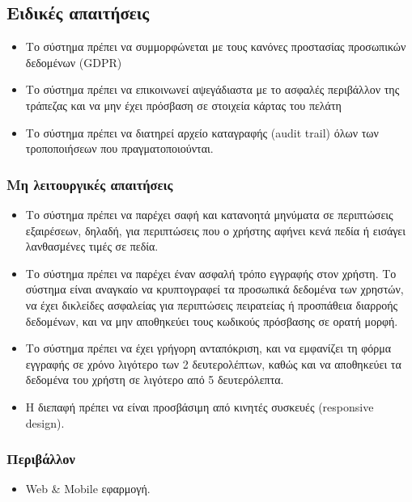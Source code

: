 \documentclass[12pt,a4paper,twoside]{book}
\begin{document}
\subsection{Ειδικές απαιτήσεις} %
\begin{itemize}
  \item Το σύστημα πρέπει να συμμορφώνεται με τους κανόνες προστασίας προσωπικών δεδομένων (GDPR)  %
  \item Το σύστημα πρέπει να επικοινωνεί αψεγάδιαστα με το ασφαλές περιβάλλον της τράπεζας και να μην έχει πρόσβαση σε στοιχεία κάρτας του πελάτη   %
  \item Το σύστημα πρέπει να διατηρεί αρχείο καταγραφής (audit trail) όλων των τροποποιήσεων που πραγματοποιούνται. %
\end{itemize}

\subsubsection{Μη λειτουργικές απαιτήσεις}
\begin{itemize}
  \item Το σύστημα πρέπει να παρέχει σαφή και κατανοητά μηνύματα σε περιπτώσεις εξαιρέσεων, δηλαδή, για περιπτώσεις που ο χρήστης αφήνει κενά πεδία ή εισάγει λανθασμένες τιμές σε πεδία.%
  \item Το σύστημα πρέπει να παρέχει έναν ασφαλή τρόπο εγγραφής στον χρήστη. Το σύστημα είναι αναγκαίο να κρυπτογραφεί τα προσωπικά δεδομένα των χρηστών, να έχει δικλείδες ασφαλείας για περιπτώσεις πειρατείας ή προσπάθεια διαρροής δεδομένων, και να μην αποθηκεύει τους κωδικούς πρόσβασης σε ορατή μορφή. %
  \item Το σύστημα πρέπει να έχει γρήγορη ανταπόκριση, και να εμφανίζει τη φόρμα εγγραφής σε χρόνο λιγότερο των 2 δευτερολέπτων, καθώς και να αποθηκεύει τα δεδομένα του χρήστη σε λιγότερο από 5 δευτερόλεπτα. %
  \item Η διεπαφή πρέπει να είναι προσβάσιμη από κινητές συσκευές (responsive design). %
\end{itemize}

\subsubsection{Περιβάλλον}
\begin{itemize}
  \item Web \& Mobile εφαρμογή.
\end{itemize}
\end{document}
